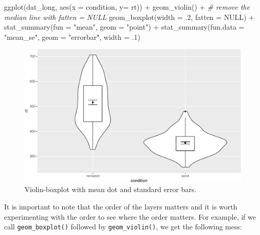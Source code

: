 \documentclass[
  english,
  doc,floatsintext]{apa6}
\newenvironment{Shaded}{\begin{snugshade}}{\end{snugshade}}
\newcommand{\AttributeTok}[1]{\textcolor[rgb]{0.77,0.63,0.00}{#1}}
\newcommand{\CommentTok}[1]{\textcolor[rgb]{0.56,0.35,0.01}{\textit{#1}}}
\newcommand{\ConstantTok}[1]{\textcolor[rgb]{0.00,0.00,0.00}{#1}}
\newcommand{\DecValTok}[1]{\textcolor[rgb]{0.00,0.00,0.81}{#1}}
\newcommand{\FunctionTok}[1]{\textcolor[rgb]{0.00,0.00,0.00}{#1}}
\newcommand{\NormalTok}[1]{#1}
\newcommand{\SpecialCharTok}[1]{\textcolor[rgb]{0.00,0.00,0.00}{#1}}
\newcommand{\StringTok}[1]{\textcolor[rgb]{0.31,0.60,0.02}{#1}}
\begin{document}
\begin{Shaded}
\begin{Highlighting}[]
\FunctionTok{ggplot}\NormalTok{(dat\_long, }\FunctionTok{aes}\NormalTok{(}\AttributeTok{x =}\NormalTok{ condition, }\AttributeTok{y=}\NormalTok{ rt)) }\SpecialCharTok{+}
  \FunctionTok{geom\_violin}\NormalTok{() }\SpecialCharTok{+}
  \CommentTok{\# remove the median line with fatten = NULL}
  \FunctionTok{geom\_boxplot}\NormalTok{(}\AttributeTok{width =}\NormalTok{ .}\DecValTok{2}\NormalTok{, }\AttributeTok{fatten =} \ConstantTok{NULL}\NormalTok{) }\SpecialCharTok{+}
  \FunctionTok{stat\_summary}\NormalTok{(}\AttributeTok{fun =} \StringTok{"mean"}\NormalTok{, }\AttributeTok{geom =} \StringTok{"point"}\NormalTok{) }\SpecialCharTok{+}
  \FunctionTok{stat\_summary}\NormalTok{(}\AttributeTok{fun.data =} \StringTok{"mean\_se"}\NormalTok{, }\AttributeTok{geom =} \StringTok{"errorbar"}\NormalTok{, }\AttributeTok{width =}\NormalTok{ .}\DecValTok{1}\NormalTok{)}
\end{Highlighting}
\end{Shaded}

\begin{figure}

{\centering \includegraphics[width=1\linewidth]{images/viobox1-1} 

}

\caption{Violin-boxplot with mean dot and standard error bars.}\label{fig:viobox1}
\end{figure}

It is important to note that the order of the layers matters and it is worth experimenting with the order to see where the order matters. For example, if we call \texttt{geom\_boxplot()} followed by \texttt{geom\_violin()}, we get the following mess:
\end{document}
